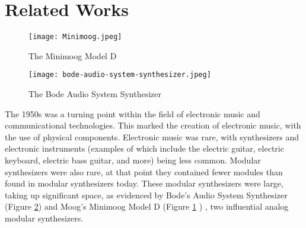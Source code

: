 \section{Related Works}\label{section:mod-synth-history}

\begin{figure}
  \centering
  \texttt{[image: Minimoog.jpeg]}
  \caption{The Minimoog Model D} \cite{Crab_2019a}
  \label{fig:minimoog}
\end{figure}

\begin{figure}
  \centering
  \texttt{[image: bode-audio-system-synthesizer.jpeg]}
  \caption{The Bode Audio System Synthesizer} \cite{Krash_2005}
  \label{fig:bode-audio-system-synthesizer}
\end{figure}


The 1950s was a turning point within the field of electronic music and communicational technologies. This marked the creation of electronic music, with the use of physical components. Electronic music was rare, with synthesizers and electronic instruments (examples of which include the electric guitar, electric keyboard, electric bass guitar, and more) being less common. Modular synthesizers were also rare, at that point they contained fewer modules than found in modular synthesizers today. These modular synthesizers were large, taking up significant space, as evidenced by Bode's Audio System Synthesizer (Figure \ref{fig:bode-audio-system-synthesizer}) \cite{Crab_2019a} \cite{Says_2014} and Moog's Minimoog Model D (Figure \ref{fig:minimoog} \cite{Krash_2005}) \cite{Pinch_Trocco_1998} \cite{Pinch_Trocco_2004}, two influential analog modular synthesizers.

